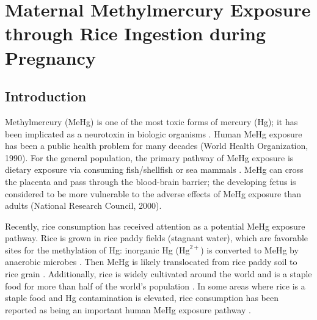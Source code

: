 \chapter{Maternal Methylmercury Exposure through Rice Ingestion during Pregnancy}

\section{Introduction}

Methylmercury (MeHg) is one of the most toxic forms of mercury (Hg); it has been implicated as a neurotoxin in biologic organisms \citep{clarkson2006toxicology}. Human MeHg exposure has been a public health problem for many decades (World Health Organization, 1990). For the general population, the primary pathway of MeHg exposure is dietary exposure via consuming fish/shellfish or sea mammals \citep{mergler2007methylmercury}. MeHg can cross the placenta and pass through the blood-brain barrier; the developing fetus is considered to be more vulnerable to the adverse effects of MeHg exposure than adults (National Research Council, 2000).

Recently, rice consumption has received attention as a potential MeHg exposure pathway. Rice is grown in rice paddy fields (stagnant water), which are favorable sites for the methylation of Hg: inorganic Hg (\(\text{Hg}^{2+}\)) is converted to MeHg by anaerobic microbes \citep{rothenberg2014rice}. Then MeHg is likely translocated from rice paddy soil to rice grain \citep{rothenberg2014rice}. Additionally, rice is widely cultivated around the world and is a staple food for more than half of the world's population \citep{mohanty2013trends}. In some areas where rice is a staple food and Hg contamination is elevated, rice consumption has been reported as being an important human MeHg exposure pathway \citep{feng2007human,liang2015human}. 


